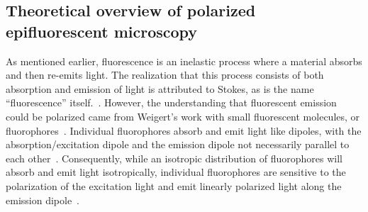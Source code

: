 \subsection{Theoretical overview of polarized epifluorescent microscopy}
As mentioned earlier, fluorescence is an inelastic process where a material absorbs and then re-emits light.
The realization that this process consists of both absorption and emission of light is attributed to Stokes, as is the name ``fluorescence'' itself.~\cite{RN286,RN287}.
However, the understanding that fluorescent emission could be polarized came from Weigert's work with small fluorescent molecules, or fluorophores~\cite{RN285}.
Individual fluorophores absorb and emit light like dipoles, with the absorption/excitation dipole and the emission dipole not necessarily parallel to each other~\cite{RN282}.
Consequently, while an isotropic distribution of fluorophores will absorb and emit light isotropically, individual fluorophores are sensitive to the polarization of the excitation light and emit linearly polarized light along the emission dipole~\cite{RN282}.

